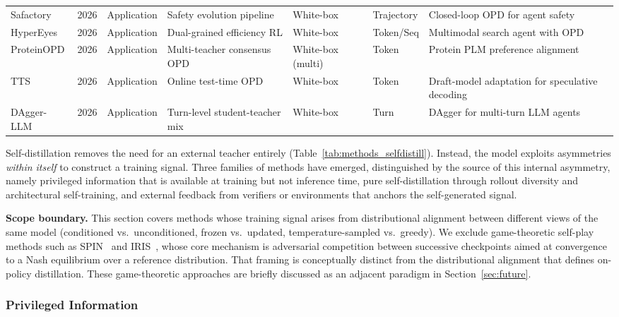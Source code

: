 \documentclass{article} %
\begin{document}
\begin{table}[t]
{\begin{tabular}{@{}lclllll@{}}
        Safactory \citep{2605.06230} & 2026 & Application & Safety evolution pipeline & White-box & Trajectory & Closed-loop OPD for agent safety \\
        HyperEyes \citep{2605.07177} & 2026 & Application & Dual-grained efficiency RL & White-box & Token/Seq & Multimodal search agent with OPD \\
        ProteinOPD \citep{2605.10189} & 2026 & Application & Multi-teacher consensus OPD & White-box (multi) & Token & Protein PLM preference alignment \\
        TTS \citep{2605.09329} & 2026 & Application & Online test-time OPD & White-box & Token & Draft-model adaptation for speculative decoding \\
        DAgger-LLM \citep{2605.12913} & 2026 & Application & Turn-level student-teacher mix & White-box & Turn & DAgger for multi-turn LLM agents \\
        \bottomrule
    \end{tabular}
    }
\end{table}

Self-distillation removes the need for an external teacher entirely (Table~\ref{tab:methods_selfdistill}). Instead, the model exploits asymmetries \emph{within itself} to construct a training signal. Three families of methods have emerged, distinguished by the source of this internal asymmetry, namely privileged information that is available at training but not inference time, pure self-distillation through rollout diversity and architectural self-training, and external feedback from verifiers or environments that anchors the self-generated signal.

\textbf{Scope boundary.} This section covers methods whose training signal arises from distributional alignment between different views of the same model (conditioned vs.\ unconditioned, frozen vs.\ updated, temperature-sampled vs.\ greedy). We exclude game-theoretic self-play methods such as SPIN~\citep{2401.01335} and IRIS~\citep{2604.20933}, whose core mechanism is adversarial competition between successive checkpoints aimed at convergence to a Nash equilibrium over a reference distribution. That framing is conceptually distinct from the distributional alignment that defines on-policy distillation. These game-theoretic approaches are briefly discussed as an adjacent paradigm in Section~\ref{sec:future}.

\subsubsection{Privileged Information}
\label{subsec:self_pi}
\end{document}
